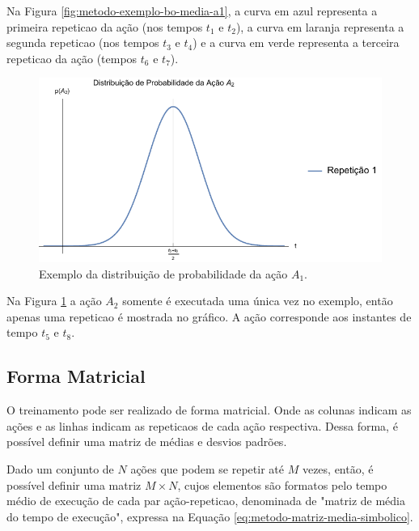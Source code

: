 Na Figura \ref{fig:metodo-exemplo-bo-media-a1}, a curva em azul representa a primeira \gls{repeticao} da ação (nos tempos $t_1$ e $t_2$), a curva em laranja representa a segunda \gls{repeticao} (nos tempos $t_3$ e $t_4$) e a curva em verde representa a terceira \gls{repeticao} da ação (tempos $t_6$ e $t_7$).

\begin{figure}[htb]
	\caption{\label{fig:metodo-exemplo-bo-media-a2} Exemplo da distribuição de probabilidade da ação $A_1$.}
	\begin{center}
	    \includegraphics[width=\linewidth]{../Mathematica/Images/Exemplo_BO_Media_A2.pdf}
	\end{center}
\end{figure}

Na Figura \ref{fig:metodo-exemplo-bo-media-a2} a ação $A_2$ somente é executada uma única vez no exemplo, então apenas uma \gls{repeticao} é mostrada no gráfico. A ação corresponde aos instantes de tempo $t_5$ e $t_8$.

			\subsection{Forma Matricial}
O treinamento pode ser realizado de forma matricial. Onde as colunas indicam as ações e as linhas indicam as \glspl{repeticao} de cada ação respectiva. Dessa forma, é possível definir uma matriz de médias e desvios padrões.

Dado um conjunto de $N$ ações que podem se repetir até $M$ vezes, então, é possível definir uma matriz $M \times N$, cujos elementos são formatos pelo tempo médio de execução de cada par ação-\gls{repeticao}, denominada de "matriz de média do tempo de execução", expressa na Equação \ref{eq:metodo-matriz-media-simbolico}.

